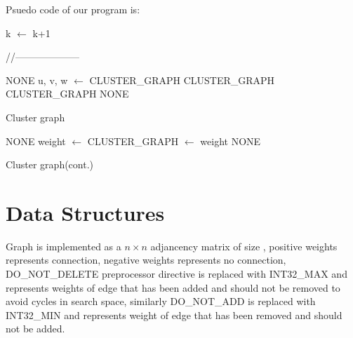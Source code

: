 \documentclass[5p,twocolumn,final]{elsarticle}
\begin{document}
Psuedo code of our program is:
\begin{algorithm}[H]
	\begin{algorithmic}	[1]
		    \State k $\gets$ k+1 \EndWhile
		\EndFunction
	\end{algorithmic}	
	//--------------------
	\begin{algorithmic}	[1]
    				\Return NONE
				\EndIf
				\State \State u, v, w $\gets$  
				\State {}
    				\Return \textup{CLUSTER\_GRAPH}
				\EndIf
    				\Return \textup{CLUSTER\_GRAPH}
				\EndIf
    				\Return \textup{CLUSTER\_GRAPH}
				\EndIf
				\State \State\Return NONE												
		\EndFunction
	\end{algorithmic}
 \caption{Cluster graph}
\end{algorithm}
\begin{algorithm}[h]	
	\begin{algorithmic}	[1]
				\Return NONE
			\EndIf
			\State\State weight $\gets$ 
			\State{}
				\State {}
			\EndIf
				\State {}
			\EndIf
			\State{}
	    				\Return CLUSTER\_GRAPH
			\EndIf
			\State\State {} $\gets$ weight			\quad\quad {}
			\State\State\Return NONE													
		\EndFunction
	\end{algorithmic}

\caption{Cluster graph(cont.)}
\end{algorithm}

\section{Data Structures}
Graph is implemented as a $n \times n$ adjancency matrix of size , positive weights represents connection, negative weights represents no connection, DO\_NOT\_DELETE preprocessor directive is replaced with INT32\_MAX and represents weights of edge that has been added and should not be removed to avoid cycles in search space, similarly DO\_NOT\_ADD is replaced with INT32\_MIN and represents weight of edge that has been removed and should not be added.
\end{document}
